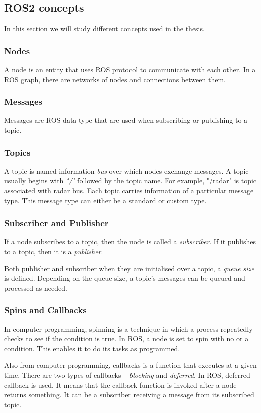 \subsection{ROS2 concepts}
In this section we will study different concepts used in the thesis.
\subsubsection*{Nodes}
A node is an entity that uses ROS protocol to communicate with each other. In a ROS graph,
there are networks of nodes and connections between them.
\subsubsection*{Messages}
Messages are ROS data type that are used when subscribing or publishing to a topic.
\subsubsection*{Topics}
A topic is named information \textit{bus} over which nodes exchange messages.
A topic usually begins with \textit{"/"} followed by the topic name. For example, "/radar"
is topic associated with radar bus. Each topic carries information of a particular message
type. This message type can either be a standard or custom type.
\subsubsection*{Subscriber and Publisher}
If a node subscribes to a topic, then the node is called a \textit{subscriber}. If it
publishes to a topic, then it is a \textit{publisher}.

Both publisher and subscriber when they are initialised over a topic, a \textit{queue
size} is defined. Depending on the queue size, a topic's messages can be queued and
processed as needed.
\subsubsection*{Spins and Callbacks}
In computer programming, spinning is a technique in which a process repeatedly checks to
see if the condition is true. In ROS, a node is set to spin with no or a condition. This
enables it to do its tasks as programmed.

Also from computer programming, callbacks is a function that executes at a given time.
There are two types of callbacks -- \textit{blocking} and \textit{deferred}. In ROS,
deferred callback is used. It means that the callback function is invoked after a node
returns something. It can be a subscriber receiving a message from its subscribed topic.

